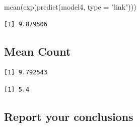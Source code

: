 \documentclass[
  letterpaper,
  DIV=11,
  numbers=noendperiod]{scrartcl}
\newenvironment{Shaded}{\begin{snugshade}}{\end{snugshade}}
\newcommand{\AttributeTok}[1]{\textcolor[rgb]{0.40,0.45,0.13}{#1}}
\newcommand{\ConstantTok}[1]{\textcolor[rgb]{0.56,0.35,0.01}{#1}}
\newcommand{\DecValTok}[1]{\textcolor[rgb]{0.68,0.00,0.00}{#1}}
\newcommand{\FunctionTok}[1]{\textcolor[rgb]{0.28,0.35,0.67}{#1}}
\newcommand{\NormalTok}[1]{\textcolor[rgb]{0.00,0.23,0.31}{#1}}
\newcommand{\OtherTok}[1]{\textcolor[rgb]{0.00,0.23,0.31}{#1}}
\newcommand{\SpecialCharTok}[1]{\textcolor[rgb]{0.37,0.37,0.37}{#1}}
\newcommand{\StringTok}[1]{\textcolor[rgb]{0.13,0.47,0.30}{#1}}
\begin{document}
\begin{Shaded}
\begin{Highlighting}[]
\FunctionTok{mean}\NormalTok{(}\FunctionTok{exp}\NormalTok{(}\FunctionTok{predict}\NormalTok{(model4, }\AttributeTok{type =} \StringTok{"link"}\NormalTok{)))}
\end{Highlighting}
\end{Shaded}

\begin{verbatim}
[1] 9.879506
\end{verbatim}

\subsection{Mean Count}

\begin{Shaded}
\end{Shaded}

\begin{verbatim}
[1] 9.792543
\end{verbatim}

\begin{Shaded}
\end{Shaded}

\begin{verbatim}
[1] 5.4
\end{verbatim}

\subsection{Report your conclusions}\label{report-your-conclusions}
\end{document}
